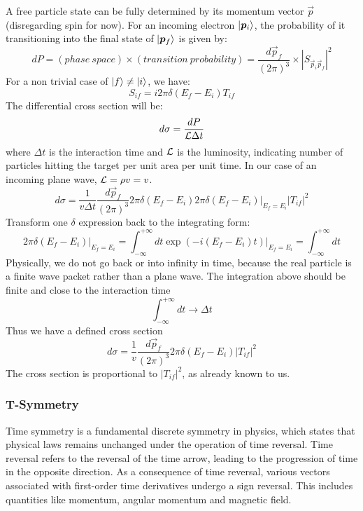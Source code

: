 A free particle state can be fully determined by its momentum vector $\vec{p}$
(disregarding spin for now). For an incoming electron $\ket{\boldsymbol{p}_i}$, the probability
of it transitioning into the final state of $\ket{\boldsymbol{p}_f}$ is given by:
\begin{equation}
    dP = (phase\ space) \times (transition\ probability) = \frac{d\vec{p}_f}{(2\pi)^3} \times |S_{\vec{p}_i\vec{p}_f}|^2
\end{equation}
For a non trivial case of $\ket{f} \ne \ket{i}$, we have:
\begin{equation}
    S_{if} = i2\pi \delta(E_f - E_i)T_{if}
\end{equation}
The differential cross section will be:
\begin{equation}
    d\sigma = \frac{dP}{\mathcal{L} \Delta t}
\end{equation}
where $\Delta t$ is the interaction time and $\mathcal{L}$ is the luminosity, indicating 
number of particles hitting the target per unit area per unit time. 
In our case of an incoming plane wave, $\mathcal{L} = \rho v = v$.
\begin{equation}
    d\sigma = \frac{1}{v\Delta t} \frac{d\vec{p}_f}{(2\pi)^3} 2\pi\delta(E_f - E_i) \left. 2\pi\delta(E_f - E_i)\right|_{E_f = E_i} |T_{if}|^2
\end{equation}
Transform one $\delta$ expression back to the integrating form: 
\begin{equation}
    \left. 2\pi\delta(E_f - E_i) \right|_{E_f = E_i} 
    = \int_{-\infty}^{+\infty} dt \left.\exp(-i(E_f - E_i)t)\right|_{E_f = E_i}
    = \int_{-\infty}^{+\infty} dt 
\end{equation}
Physically, we do not go back or into infinity in time, because the real particle
is a finite wave packet rather than a plane wave. The integration above should 
be finite and close to the interaction time
\begin{equation}
    \int_{-\infty}^{+\infty} dt \rightarrow \Delta t
\end{equation}
Thus we have a defined cross section
\begin{equation}
    d\sigma = \frac{1}{v} \frac{d\vec{p}_f}{(2\pi)^3} 2\pi\delta(E_f - E_i) |T_{if}|^2
\end{equation}
The cross section is proportional to $|T_{if}|^2$, as already known to us.


\subsubsection{T-Symmetry}
Time symmetry is a fundamental discrete symmetry in physics, which states that physical laws remains
unchanged under the operation of time reversal. Time reversal refers to the reversal
of the time arrow, leading to the progression of time in the opposite direction.
As a consequence of time reversal, various vectors associated with first-order 
time derivatives undergo a sign reversal. This includes quantities like
momentum, angular momentum and magnetic field.


